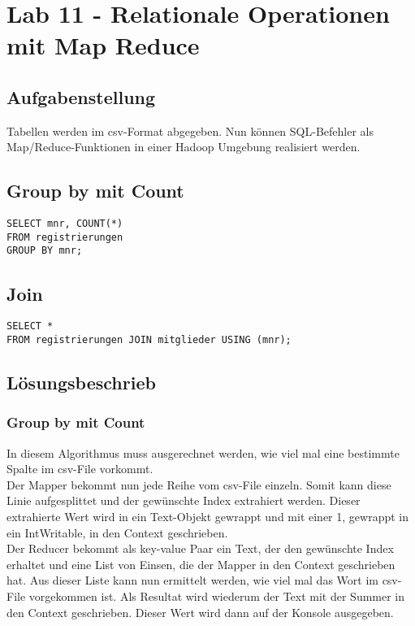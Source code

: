 \documentclass[a4paper,10pt,titlepage=false]{scrreprt}
\begin{document}
\section{Lab 11 - Relationale Operationen mit Map Reduce}
\subsection{Aufgabenstellung}
Tabellen werden im csv-Format abgegeben. Nun können SQL-Befehler als Map/Reduce-Funktionen in einer Hadoop Umgebung realisiert werden.
\subsection{Group by mit Count}
\begin{lstlisting}[style=sql]
SELECT mnr, COUNT(*)
FROM registrierungen
GROUP BY mnr;
\end{lstlisting}

\subsection{Join}
\begin{lstlisting}[style=sql]
SELECT *
FROM registrierungen JOIN mitglieder USING (mnr);
\end{lstlisting}


\subsection{Lösungsbeschrieb}
\subsubsection{Group by mit Count}
In diesem Algorithmus muss ausgerechnet werden, wie viel mal eine bestimmte Spalte im csv-File vorkommt.\\
Der Mapper bekommt nun jede Reihe vom csv-File einzeln. Somit kann diese Linie aufgesplittet und der gewünschte Index extrahiert werden. Dieser extrahierte Wert wird in ein Text-Objekt gewrappt und mit einer 1, gewrappt in ein IntWritable, in den Context geschrieben.\\
Der Reducer bekommt als key-value Paar ein Text, der den gewünschte Index erhaltet und eine List von Einsen, die der Mapper in den Context geschrieben hat. Aus dieser Liste kann nun ermittelt werden, wie viel mal das Wort im csv-File vorgekommen ist. Als Resultat wird wiederum der Text mit der Summer in den Context geschrieben. Dieser Wert wird dann auf der Konsole ausgegeben.
\end{document}
